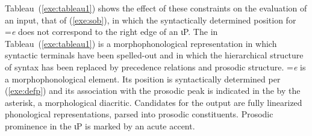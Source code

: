 \documentclass[output=paper,
modfonts
]{LSP/langsci}
\begin{document}
Tableau~(\ref{exe:tableau1}) shows the effect of these constraints on the evaluation of an input, that of (\ref{exe:sob}), in which the syntactically determined
position for =\emph{e} does not correspond to the right edge of an ιP. 
The  in Tableau~(\ref{exe:tableau1}) is a morphophonological representation in which syntactic terminals 
have been spelled-out and in which the hierarchical structure of syntax has been replaced by precedence relations and 
prosodic structure. =\emph{e} is a morphophonological element. Its position is syntactically determined per 
(\ref{exe:defp}) and its association with the prosodic peak is indicated in the  by the asterisk, a morphological diacritic.
Candidates for the output are fully linearized phonological representations, parsed into prosodic constituents. 
 Prosodic prominence in the ιP is marked by an acute accent.  
 
\end{document}
